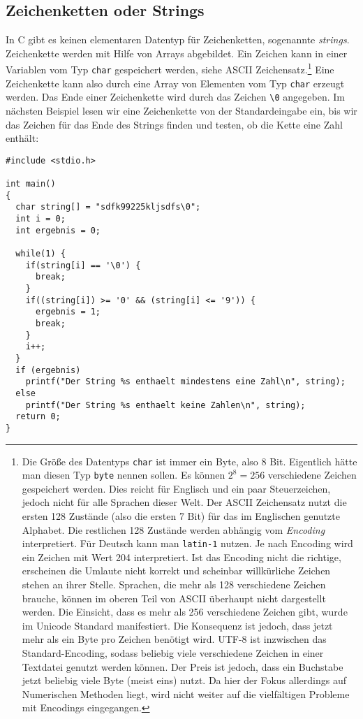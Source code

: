 \subsection{Zeichenketten oder Strings}

In C gibt es keinen elementaren Datentyp für Zeichenketten, sogenannte \emph{strings}.
Zeichenkette werden mit Hilfe von Arrays abgebildet.
Ein Zeichen kann in einer Variablen vom Typ \verb|char| gespeichert werden, siehe ASCII Zeichensatz.\footnote{%
    Die Größe des Datentyps \texttt{char} ist immer ein Byte, also 8 Bit.
    Eigentlich hätte man diesen Typ \texttt{byte} nennen sollen. Es können $2^8
    = 256$ verschiedene Zeichen gespeichert werden. Dies reicht für Englisch
    und ein paar Steuerzeichen, jedoch nicht für alle Sprachen dieser Welt. Der
    ASCII Zeichensatz nutzt die ersten 128 Zustände (also die ersten 7 Bit) für
    das im Englischen genutzte Alphabet. Die restlichen 128 Zustände werden
    abhängig vom  \emph{Encoding} interpretiert. Für Deutsch kann man
    \texttt{latin-1} nutzen. Je nach Encoding wird ein Zeichen mit Wert 204
    interpretiert. Ist das Encoding nicht die richtige, erscheinen die Umlaute
    nicht korrekt und scheinbar willkürliche Zeichen stehen an ihrer Stelle.
    Sprachen, die mehr als 128 verschiedene Zeichen brauche, können im oberen
    Teil von ASCII überhaupt nicht dargestellt werden. Die Einsicht, dass es
    mehr als 256 verschiedene Zeichen gibt, wurde im Unicode Standard
    manifestiert. Die Konsequenz ist jedoch, dass jetzt mehr als ein Byte pro
    Zeichen benötigt wird. UTF-8 ist inzwischen das Standard-Encoding, sodass
    beliebig viele verschiedene Zeichen in einer Textdatei genutzt werden
    können. Der Preis ist jedoch, dass ein Buchstabe jetzt beliebig viele Byte
    (meist eins) nutzt. Da hier der Fokus allerdings auf Numerischen Methoden
    liegt, wird nicht weiter auf die vielfältigen Probleme mit Encodings
    eingegangen.
}
Eine Zeichenkette kann also durch eine Array von Elementen vom Typ \verb|char| erzeugt werden.
Das Ende einer Zeichenkette wird durch das Zeichen \verb|\0| angegeben.
Im nächsten Beispiel lesen wir eine Zeichenkette von der Standardeingabe ein, bis wir das Zeichen für das Ende des Strings finden und testen, ob die Kette eine Zahl enthält:
\begin{lstlisting}
#include <stdio.h>

int main()
{
  char string[] = "sdfk99225kljsdfs\0";
  int i = 0;
  int ergebnis = 0;

  while(1) {
    if(string[i] == '\0') {
      break;
    }
    if((string[i]) >= '0' && (string[i] <= '9')) {
      ergebnis = 1;
      break;
    }
    i++;
  }
  if (ergebnis)
    printf("Der String %s enthaelt mindestens eine Zahl\n", string);
  else
    printf("Der String %s enthaelt keine Zahlen\n", string);
  return 0;
}
\end{lstlisting}
